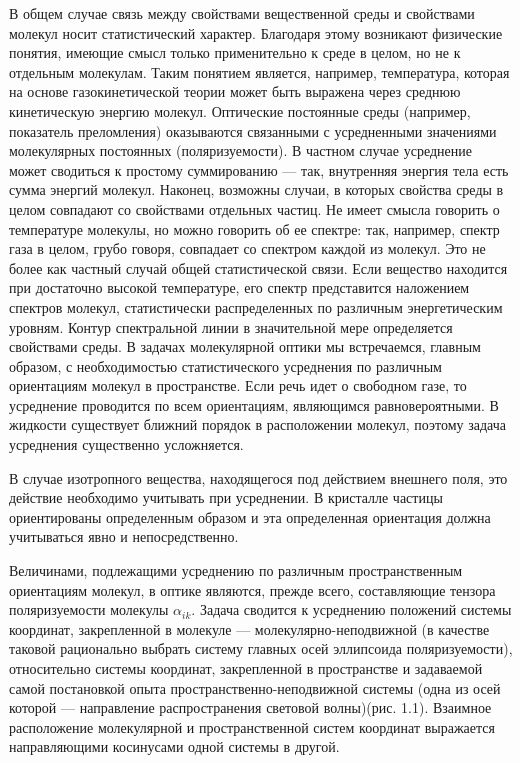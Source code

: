В общем случае связь между свойствами вещественной среды и
свойствами молекул носит статистический характер. Благодаря этому
возникают физические понятия, имеющие смысл только применительно к
среде в целом, но не к отдельным молекулам. Таким понятием
является, например, температура, которая на основе
газокинетической теории может быть выражена через среднюю
кинетическую энергию молекул. Оптические постоянные среды
(например, показатель преломления) оказываются связанными с
усредненными значениями молекулярных постоянных (поляризуемости).
В частном случае усреднение может сводиться к простому
суммированию --- так, внутренняя энергия тела есть сумма энергий
молекул. Наконец, возможны случаи, в которых свойства среды в
целом совпадают со свойствами отдельных частиц. Не имеет смысла
говорить о температуре молекулы, но можно говорить об ее спектре:
так, например, спектр газа в целом, грубо говоря, совпадает со
спектром каждой из молекул. Это не более как частный случай общей
статистической  связи. Если вещество находится при достаточно
высокой температуре, его спектр представится наложением спектров
молекул, статистически распределенных по различным энергетическим
уровням. Контур спектральной линии в значительной мере
определяется свойствами среды. В задачах молекулярной оптики мы
встречаемся, главным образом, с необходимостью статистического
усреднения по различным ориентациям молекул в пространстве. Если
речь идет о свободном газе, то усреднение проводится по всем
ориентациям, являющимся равновероятными. В жидкости существует
ближний порядок в расположении молекул, поэтому задача усреднения
существенно усложняется.

В случае изотропного вещества, находящегося под действием внешнего
поля, это действие необходимо учитывать при усреднении. В
кристалле частицы ориентированы определенным образом и эта
определенная ориентация должна учитываться явно и непосредственно.

Величинами, подлежащими усреднению по различным пространственным
ориентациям молекул, в оптике являются, прежде всего, составляющие
тензора поляризуемости молекулы $\alpha_{ik}$. Задача сводится к
усреднению положений системы координат, закрепленной в молекуле
--- молекулярно-неподвижной (в качестве таковой рационально
выбрать систему главных осей эллипсоида поляризуемости),
относительно системы координат, закрепленной в пространстве и
задаваемой самой постановкой опыта пространственно-неподвижной
системы (одна из осей которой --- направление распространения
световой волны)(рис. 1.1). Взаимное расположение молекулярной и
пространственной систем координат выражается направляющими
косинусами одной системы в другой.\vskip -2mm

